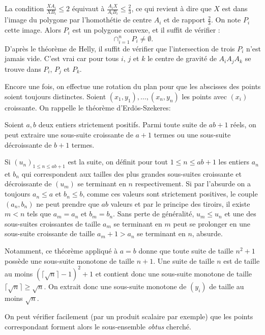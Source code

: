 \begin{sol}
La condition $\frac{XA_i}{XB_i}\le2$ équivaut à $\frac{A_iX}{A_iB_i}\le \frac 23$, ce qui revient à dire que $X$ est dans l’image du polygone par l’homothétie de centre $A_i$ et de rapport $\frac 23$. On note $P_i$ cette image. Alors $P_i$ est un polygone convexe, et il suffit de vérifier :
$$\cap_{i=1}^nP_i \ne \emptyset. $$
D’après le théorème de Helly, il suffit de vérifier que l’intersection de trois $P_i$ n’est jamais vide. C’est vrai car pour tous $i$, $j$ et $k$ le centre de gravité de $A_iA_jA_k$ se trouve dans $P_i$, $P_j$ et $P_k$.
\end{sol}

\begin{sol}
Encore une fois, on effectue une rotation du plan pour que les abscisses des points soient toujours distinctes. Soient $(x_1,y_1),\ldots,(x_n,y_n)$ les points avec $(x_i)$ croissante. On rappelle le théorème d'Erdös-Szekeres:

\begin{thm}
Soient $a,b$ deux entiers strictement positifs. Parmi toute suite de $ab+1$ réels, on peut extraire une sous-suite croissante de $a+1$ termes ou une sous-suite décroissante de $b+1$ termes.
\end{thm}

\begin{preuve}
Si $(u_n)_{1\le n\le ab+1}$ est la suite, on définit pour tout $1\le n\le ab+1$ les entiers $a_n$ et $b_n$ qui correspondent aux tailles des plus grandes sous-suites croissante et décroissante de $(u_m)$ se terminant en $n$ respectivement. Si par l'absurde on a toujours $a_n\le a$ et $b_n\le b$, comme ces valeurs sont strictement positives, le couple $(a_n,b_n)$ ne peut prendre que $ab$ valeurs et par le principe des tiroirs, il existe $m<n$ tels que $a_m=a_n$ et $b_m=b_n$. Sans perte de généralité, $u_m\le u_n$ et une des sous-suites croissantes de taille $a_m$ se terminant en $m$ peut se prolonger en une sous-suite croissante de taille $a_m+1>a_n$ se terminant en $n$, absurde.
\end{preuve}

Notamment, ce théorème appliqué à $a=b$ donne que toute suite de taille $n^2+1$ possède une sous-suite monotone de taille $n+1$. Une suite de taille $n$ est de taille au moins $(\lceil\sqrt n\rceil-1)^2+1$ et contient donc une sous-suite monotone de taille $\lceil\sqrt n\rceil\ge \sqrt n$. On extrait donc une sous-suite monotone de $(y_i)$ de taille au moins $\sqrt n$. 

On peut vérifier facilement (par un produit scalaire par exemple) que les points correspondant forment alors le sous-ensemble \textit{obtus} cherché.
\end{sol}


